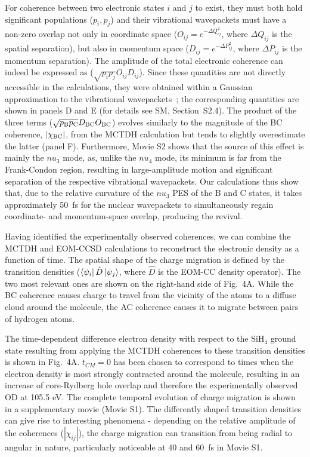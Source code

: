 \documentclass[12pt]{article}
\begin{document}
For coherence between two electronic states $i$ and $j$ to exist, they must both hold significant populations ($p_i,p_j$) and their vibrational wavepackets must have a non-zero overlap not only in coordinate space ($O_{ij} = e^{-\Delta Q_{ij}^2}$, where $\Delta Q_{ij}$ is the spatial separation), but also in momentum space ($D_{ij}= e^{- \Delta P_{ij}^2}$, where $\Delta P_{ij}$ is the momentum separation). The amplitude of the total electronic coherence can indeed be expressed as ($\sqrt{p_ip_j}O_{ij}D_{ij}$). Since these quantities are not directly accessible in the calculations, they were obtained within a Gaussian approximation to the vibrational wavepackets~\cite{golubev2020tga}; the corresponding quantities are shown in panels D and E (for details see SM, Section~S2.4). The product of the three terms ($\sqrt{p_{\rm B} p_{\rm C}} D_{\rm BC}O_{\rm BC}$) evolves similarly to the magnitude of the BC coherence, $\left|\chi_{\rm BC}\right|$, from the MCTDH calculation but tends to slightly overestimate the latter (panel F). Furthermore, Movie S2 shows that the source of this effect is mainly the $nu_3$ mode, as, unlike the $nu_4$ mode, its minimum is far from the Frank-Condon region, resulting in large-amplitude motion and significant separation of the respective vibrational wavepackets. Our calculations thus show that, due to the relative curvature of the $nu_3$ PES of the B and C states, it takes approximately 50~fs for the nuclear wavepackets to simultaneously regain coordinate- and momentum-space overlap, producing the revival. 

Having identified the experimentally observed coherences, we can combine the MCTDH and EOM-CCSD calculations to reconstruct the electronic density as a function of time. The spatial shape of the charge migration is defined by the transition densities ($\bra{\psi_i}\hat{D}\ket{\psi_j}$, where $\hat{D}$ is the EOM-CC density operator). The two most relevant ones are shown on the right-hand side of Fig.~4A. While the BC coherence causes charge to travel from the vicinity of the atoms to a diffuse cloud around the molecule, the AC coherence causes it to migrate between pairs of hydrogen atoms.

The time-dependent difference electron density with respect to the SiH$_4$ ground state resulting from applying the MCTDH coherences to these transition densities is shown in Fig.~4A. $t_{CM}=0$ has been chosen to correspond to times when the electron density is most strongly contracted around the molecule, resulting in an increase of core-Rydberg hole overlap and therefore the experimentally observed OD at 105.5 eV. The complete temporal evolution of charge migration is shown in a supplementary movie (Movie S1). The differently shaped transition densities can give rise to interesting phenomena - depending on the relative amplitude of the coherences ($\left|\chi_{ij}\right|$), the charge migration can transition from being radial to angular in nature, particularly noticeable at 40 and 60~fs in Movie S1. 
\end{document}
